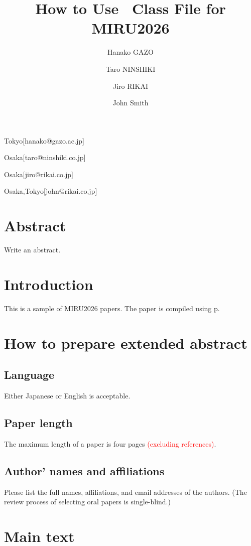 \documentclass[MIRU,submit,english]{miru2026e}
\begin{document}
\title{How to Use \LaTeXe\ Class File for MIRU2026}


 \author{Hanako GAZO}{Tokyo}[hanako@gazo.ac.jp]
 \author{Taro NINSHIKI}{Osaka}[taro@ninshiki.co.jp]
 \author{Jiro RIKAI}{Osaka}[jiro@rikai.co.jp]
 \author{John Smith}{Osaka,Tokyo}[john@rikai.co.jp]

\maketitle

\section*{Abstract}
Write an abstract.

\section{Introduction}
This is a sample of MIRU2026 papers.
The paper is compiled using p\LaTeXe. 

\section{How to prepare extended abstract}

\subsection{Language}

Either Japanese or English is acceptable. 

\subsection{Paper length}

The maximum length of a paper is four pages \textcolor{red}{(excluding references)}. 

\subsection{Author' names and affiliations}

Please list the full names, affiliations, and email addresses of the authors.
(The review process of selecting oral papers is single-blind.)

\section{Main text}
\end{document}
